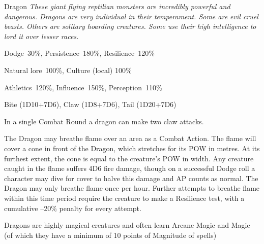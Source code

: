 \newpage


\begin{monsterbox}{Dragon}
	\textit{These giant flying reptilian monsters are incredibly powerful and dangerous. Dragons are very individual in their temperament. Some are evil cruel beasts. Others are solitary hoarding creatures. Some use their high intelligence to lord it over lesser races.}\\
	\rpghline
	\basics[%
        hitpoints  = 50, %
	majorwound = 25,
	damagemodifier = +7D6,
	powerpoints = 26,
	movementrate = {30m, 45m when flying},
	armor = Dragon Scales (12AP),
	plunderrating = 5-6
	]
	\rpghline%
	\stats[ %
		STR = 20D6    (70),
		CON = 10D6    (35),
		DEX = 4D6     (14),
		SIZ = 10D6+30 (65),
		INT = 6D6     (21),
		POW = 4D6+12  (26),
		CHA = 6D6     (21)
	]
	\rpghline%
	\begin{rpg-monsteraction}[Resistances]
		Dodge~30\%, Persistence~180\%, Resilience~120\%
	\end{rpg-monsteraction}
	\begin{rpg-monsteraction}[Knowledge]
		Natural lore~100\%, Culture (local) 100\%
	\end{rpg-monsteraction}
	\begin{rpg-monsteraction}[Practical]
		Athletics~120\%, Influence~150\%, Perception~110\%
	\end{rpg-monsteraction}
	\begin{rpg-monsteraction}
		Bite (1D10+7D6), Claw (1D8+7D6), Tail (1D20+7D6)
	\end{rpg-monsteraction}
	\begin{rpg-monsteraction}
		In a single Combat Round a dragon can make two claw attacks.
	\end{rpg-monsteraction}
	\begin{rpg-monsteraction}
		The Dragon may breathe flame over an area as a Combat Action. The flame will cover a cone in front of the Dragon, which stretches for its POW in metres. At its furthest extent, the cone is equal to the creature’s POW in width.
		Any creature caught in the flame suffers 4D6 fire damage, though on a successful Dodge roll a character may dive for cover to halve this damage and AP counts as normal.
		The Dragon may only breathe flame once per hour. Further attempts to breathe flame within this time period require the creature to make a Resilience test, with a cumulative –20\% penalty for every attempt.
	\end{rpg-monsteraction}
	\begin{rpg-monsteraction}[Supernatural]
		Dragons are highly magical creatures and often learn Arcane Magic and Magic (of which they have a minimum of 10 points of Magnitude of spells)
	\end{rpg-monsteraction}
\end{monsterbox}

